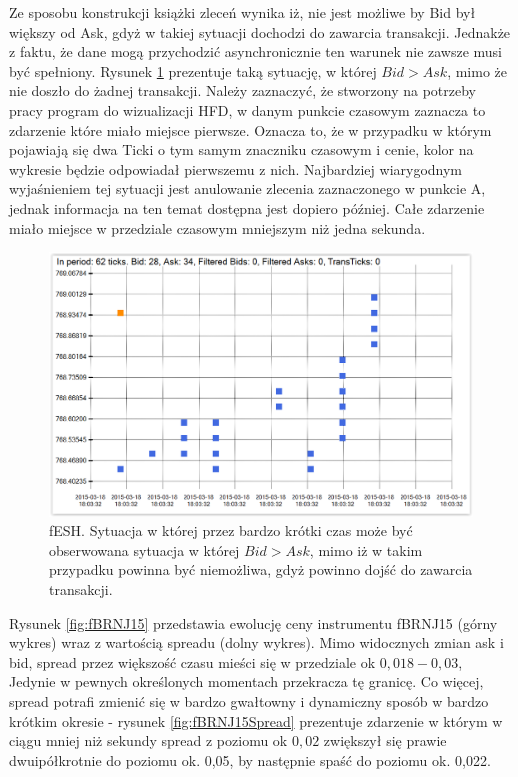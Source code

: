 \documentclass[a4paper,12pt,openany, DIV=calc, headsepline]{scrbook}
\begin{document}
Ze sposobu konstrukcji książki zleceń wynika iż, nie jest możliwe by Bid był większy od Ask, gdyż w takiej sytuacji dochodzi do zawarcia transakcji. Jednakże z faktu, że dane mogą przychodzić asynchronicznie ten warunek nie zawsze musi być spełniony. Rysunek \ref{fig:fpah15} prezentuje taką sytuację, w której $Bid > Ask$, mimo że nie doszło do żadnej transakcji. Należy zaznaczyć, że stworzony na potrzeby pracy program do wizualizacji HFD, w danym punkcie czasowym zaznacza to zdarzenie które miało miejsce pierwsze. Oznacza to, że w przypadku w którym pojawiają się dwa Ticki o tym samym znaczniku czasowym i cenie, kolor na wykresie będzie odpowiadał pierwszemu z nich. Najbardziej wiarygodnym wyjaśnieniem tej sytuacji jest anulowanie zlecenia zaznaczonego w punkcie A, jednak informacja na ten temat dostępna jest dopiero później. Całe zdarzenie miało miejsce w przedziale czasowym mniejszym niż jedna sekunda.


\begin{figure}[H]
  \centering
  \includegraphics[scale=0.5]{wykresy/fpah15.PNG}
  \caption{fESH. Sytuacja w której przez bardzo krótki czas może być obserwowana sytuacja w której $Bid > Ask$, mimo iż w takim przypadku powinna być niemożliwa, gdyż powinno dojść do zawarcia transakcji.}
  \label{fig:fpah15}
\end{figure}

Rysunek \ref{fig:fBRNJ15} przedstawia ewolucję ceny instrumentu fBRNJ15 (górny wykres) wraz z wartością spreadu (dolny wykres). Mimo widocznych zmian ask i bid, spread przez większość czasu mieści się w przedziale ok $0,018-0,03$, Jedynie w pewnych określonych momentach przekracza tę granicę. Co więcej, spread potrafi zmienić się w bardzo gwałtowny i dynamiczny sposób w bardzo krótkim okresie - rysunek \ref{fig:fBRNJ15Spread} prezentuje zdarzenie w którym w ciągu mniej niż sekundy spread z poziomu ok $0,02$ zwiększył się prawie dwuipółkrotnie do poziomu ok. 0,05, by następnie spaść do poziomu ok. 0,022. 
\end{document}
